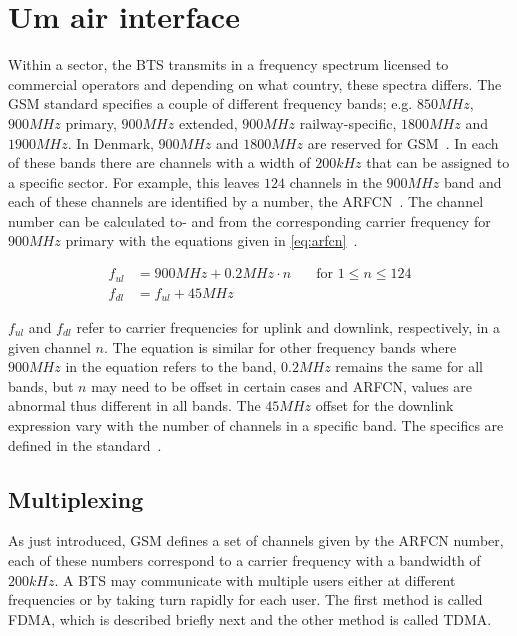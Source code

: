 \section{Um air interface}
\label{sec:gsm_air_interface}
Within a sector, the \gls{BTS} transmits in a frequency spectrum
licensed to commercial operators and depending on what country, these
spectra differs. The \gls{GSM} standard specifies a couple of
different frequency bands; e.g. $850\si{MHz}$, $900\si{MHz}$ primary,
$900\si{MHz}$ extended, $900\si{MHz}$ railway-specific, $1800\si{MHz}$
and $1900\si{MHz}$. In Denmark, $900\si{MHz}$ and $1800\si{MHz}$ are
reserved for GSM~\cite{frequencyspectrum}. In each of these bands
there are channels with a width of $200\si{kHz}$ that can be assigned
to a specific sector. For example, this leaves $124$ channels in the
$900\si{MHz}$ band and each of these channels are identified by a
number, the \gls{ARFCN}~\cite[p. 21--22]{gsmtolte}. The channel number
can be calculated to- and from the corresponding carrier frequency for
$900\si{MHz}$ primary with the equations given in
\cref{eq:arfcn}~\cite[p. 10]{arfcn}.

\begin{equation}
  \begin{aligned}
    f_{ul} &= 900\si{MHz} + 0.2\si{MHz} \cdot n & \quad \text{for } 1 \leq n \leq 124\\
    f_{dl} &= f_{ul} + 45\si{MHz} &
  \end{aligned}
  \label{eq:arfcn}
\end{equation}

$f_{ul}$ and $f_{dl}$ refer to carrier frequencies for uplink and
downlink, respectively, in a given channel $n$. The equation is
similar for other frequency bands where $900\si{MHz}$ in the equation
refers to the band, $0.2\si{MHz}$ remains the same for all bands, but
$n$ may need to be offset in certain cases and \gls{ARFCN}, values are
abnormal thus different in all bands. The $45\si{MHz}$ offset for the
downlink expression vary with the number of channels in a specific
band. The specifics are defined in the standard~\cite[p. 10]{arfcn}.
\subsection{Multiplexing}
As just introduced, \gls{GSM} defines a set of channels given by the
\gls{ARFCN} number, each of these numbers correspond to a carrier
frequency with a bandwidth of $200\si{kHz}$. A \gls{BTS} may
communicate with multiple users either at different frequencies or by
taking turn rapidly for each user. The first method is called
\gls{FDMA}, which is described briefly next and the other method is
called \gls{TDMA}.\

